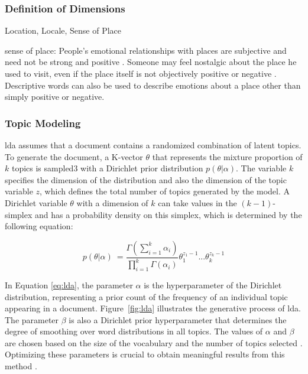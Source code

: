 \documentclass{article}
\begin{document}
\subsubsection{Definition of Dimensions}
Location, Locale, Sense of Place

sense of place:
People's emotional relationships with places are subjective and need not be strong and positive \citep{altman_place_1992}. Someone may feel nostalgic about the place he used to visit, even if the place itself is not objectively positive or negative \cite{relph_geographical_1985}. Descriptive words can also be used to describe emotions about a place other than simply positive or negative.

\subsubsection{Topic Modeling}
 \acrshort{lda} assumes that a document contains a randomized combination of latent topics. To generate the document, a K-vector \(\theta\) that represents the mixture proportion of \(k\) topics is sampled3 with a Dirichlet prior distribution \(p(\theta|\alpha)\). The variable \(k\) specifies the dimension of the distribution and also the dimension of the topic variable \(z\), which defines the total number of topics generated by the model. A Dirichlet variable \(\theta\) with a dimension of \(k\) can take values in the \((k-1)\)-simplex and has a probability density on this simplex, which is determined by the following equation:

\begin{equation} \label{eq:lda}
    p(\theta|\alpha)\ = \frac{\Gamma(\sum_{i=1}^{k} \alpha_{i})}{\prod_{i=1}^{k}\Gamma(\alpha_{i})}\theta_{1}^{z_{1}-1}...\theta_{k}^{z_{k}-1}
\end{equation}

In Equation \ref{eq:lda}, the parameter \(\alpha\) is the hyperparameter of the Dirichlet distribution, representing a prior count of the frequency of an individual topic appearing in a document. Figure~\ref{fig:lda} illustrates the generative process of \acrshort{lda}. The parameter \(\beta\) is also a Dirichlet prior hyperparameter that determines the degree of smoothing over word distributions in all topics. The values of \(\alpha\) and \(\beta\) are chosen based on the size of the vocabulary and the number of topics selected \citep{blei_latent_2003}. Optimizing these parameters is crucial to obtain meaningful results from this method \citep{vayansky_review_2020}. 
\end{document}
